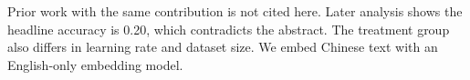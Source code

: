 \documentclass{article}
\begin{document}
\begin{abstract}
The headline result is an accuracy of 0.90.
\end{abstract}
Prior work with the same contribution is not cited here.
Later analysis shows the headline accuracy is 0.20, which contradicts the abstract.
The treatment group also differs in learning rate and dataset size.
We embed Chinese text with an English-only embedding model.
\end{document}
